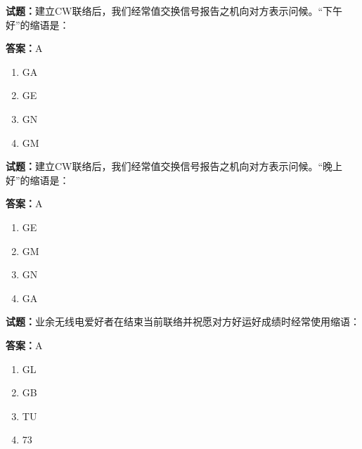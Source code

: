 \documentclass{ctexbook}
\begin{document}




\vspace{1em}

\textbf{试题：}建立CW联络后，我们经常值交换信号报告之机向对方表示问候。“下午好”的缩语是： 

\textbf{答案：}A 

\begin{enumerate}[leftmargin=3em]
  \item GA 

  \item GE 

  \item GN 

  \item GM 


\end{enumerate}





\vspace{1em}

\textbf{试题：}建立CW联络后，我们经常值交换信号报告之机向对方表示问候。“晚上好”的缩语是： 

\textbf{答案：}A 

\begin{enumerate}[leftmargin=3em]
  \item GE 

  \item GM 

  \item GN 

  \item GA 

\end{enumerate}





\vspace{1em}

\textbf{试题：}业余无线电爱好者在结束当前联络并祝愿对方好运好成绩时经常使用缩语： 

\textbf{答案：}A 

\begin{enumerate}[leftmargin=3em]
  \item GL 

  \item GB 

  \item TU 

  \item 73 

\end{enumerate}
\end{document}
